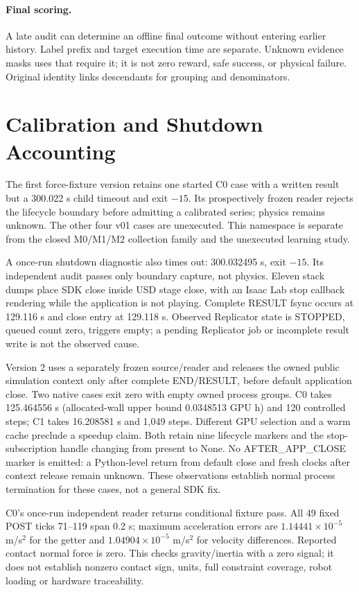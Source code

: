 \documentclass{article}
\begin{document}
\paragraph{Final scoring.} A late audit can determine an offline final outcome without entering earlier history. Label prefix and target execution time are separate. Unknown evidence masks uses that require it; it is not zero reward, safe success, or physical failure. Original identity links descendants for grouping and denominators.

\section{Calibration and Shutdown Accounting}
The first force-fixture version retains one started C0 case with a written result but a 300.022 s child timeout and exit $-15$. Its prospectively frozen reader rejects the lifecycle boundary before admitting a calibrated series; physics remains unknown. The other four v01 cases are unexecuted. This namespace is separate from the closed M0/M1/M2 collection family and the unexecuted learning study.

A once-run shutdown diagnostic also times out: 300.032495 s, exit $-15$. Its independent audit passes only boundary capture, not physics. Eleven stack dumps place SDK close inside USD stage close, with an Isaac Lab stop callback rendering while the application is not playing. Complete RESULT fsync occurs at 129.116 s and close entry at 129.118 s. Observed Replicator state is STOPPED, queued count zero, triggers empty; a pending Replicator job or incomplete result write is not the observed cause.

Version 2 uses a separately frozen source/reader and releases the owned public simulation context only after complete END/RESULT, before default application close. Two native cases exit zero with empty owned process groups. C0 takes 125.464556 s (allocated-wall upper bound 0.0348513 GPU h) and 120 controlled steps; C1 takes 16.208581 s and 1,049 steps. Different GPU selection and a warm cache preclude a speedup claim. Both retain nine lifecycle markers and the stop-subscription handle changing from present to None. No AFTER\_APP\_CLOSE marker is emitted: a Python-level return from default close and fresh clocks after context release remain unknown. These observations establish normal process termination for these cases, not a general SDK fix.

C0's once-run independent reader returns conditional fixture pass. All 49 fixed POST ticks 71--119 span 0.2 s; maximum acceleration errors are $1.14441\times10^{-5}$ m/s$^2$ for the getter and $1.04904\times10^{-5}$ m/s$^2$ for velocity differences. Reported contact normal force is zero. This checks gravity/inertia with a zero signal; it does not establish nonzero contact sign, units, full constraint coverage, robot loading or hardware traceability.
\end{document}
